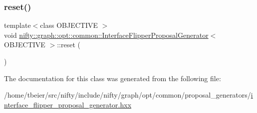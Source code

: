 \mbox{\label{classnifty_1_1graph_1_1opt_1_1common_1_1InterfaceFlipperProposalGenerator_a73064df4f691b0f2783085ecb9d03102}} 
\subsubsection{\texorpdfstring{reset()}{reset()}}
{\footnotesize\ttfamily template$<$class O\+B\+J\+E\+C\+T\+I\+VE $>$ \\
void \hyperlink{classnifty_1_1graph_1_1opt_1_1common_1_1InterfaceFlipperProposalGenerator}{nifty\+::graph\+::opt\+::common\+::\+Interface\+Flipper\+Proposal\+Generator}$<$ O\+B\+J\+E\+C\+T\+I\+VE $>$\+::reset (\begin{DoxyParamCaption}{ }\end{DoxyParamCaption})\hspace{0.3cm}{\ttfamily [inline]}}



The documentation for this class was generated from the following file\+:\begin{DoxyCompactItemize}
\item 
/home/tbeier/src/nifty/include/nifty/graph/opt/common/proposal\+\_\+generators/\hyperlink{interface__flipper__proposal__generator_8hxx}{interface\+\_\+flipper\+\_\+proposal\+\_\+generator.\+hxx}\end{DoxyCompactItemize}
